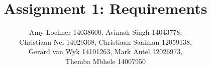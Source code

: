 \documentclass[COS301 - Team Alpha]{article}
\title{Assignment 1: Requirements}
\author{Amy Lochner 14038600, Avinash Singh 14043778, \\
Christiaan Nel 14029368, Christiaan Saaiman 12059138, \\
Gerard van Wyk 14101263, Mark Antel 12026973,\\
 Themba Mbhele 14007950}
\begin{document}
\maketitle


\section{}
\end{document}
